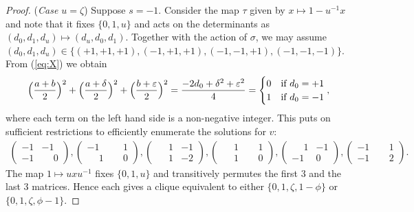 \documentclass{amsart}
\theoremstyle{plain}
\theoremstyle{definition}
\begin{document}
\begin{proof}
	(\emph{Case \(u=\zeta\)})
	Suppose \(s=-1\).
	Consider the map \(\tau\) given by \(x\mapsto1-u^{-1}x\) and note that it fixes \(\{0,1,u\}\) and acts on the determinants as \((d_0,d_1,d_u)\mapsto(d_u,d_0,d_1)\). Together with the action of \(\sigma\), we may assume \((d_0,d_1,d_u)\in\{(+1,+1,+1),(-1,+1,+1),(-1,-1,+1),(-1,-1,-1)\}\).
	From (\ref{eq:X}) we obtain
	\begin{align*}
		\Big(\frac{a+b}{2}\Big)^2 + \Big(\frac{a+\delta}{2}\Big)^2 + \Big(\frac{b+\varepsilon}{2}\Big)^2 = \frac{-2d_0+\delta^2+\varepsilon^2}{4} = 
		\begin{cases}
			0 & \textup{if } d_0=+1 \\
			1 & \textup{if } d_0=-1
		\end{cases},
	\end{align*}
	where each term on the left hand side is a non-negative integer. This puts on sufficient restrictions to efficiently enumerate the solutions for \(v\):
	\begin{align*}
		\begin{pmatrix}
			-1 & -1 \\
			-1 & \phantom{-}0
		\end{pmatrix},
		\begin{pmatrix}
			-1 & \phantom{-}1 \\
			\phantom{-}1 & \phantom{-}0
		\end{pmatrix},
		\begin{pmatrix}
			\phantom{-}1 & -1 \\
			\phantom{-}1 & -2
		\end{pmatrix},
		\begin{pmatrix}
			\phantom{-}1 & \phantom{-}1 \\
			\phantom{-}1 & \phantom{-}0
		\end{pmatrix},
		\begin{pmatrix}
			\phantom{-}1 & -1 \\
			-1 & 0
		\end{pmatrix},
		\begin{pmatrix}
			-1 & \phantom{-}1 \\
			-1 & \phantom{-}2
		\end{pmatrix}.
	\end{align*}
	The map \(1\mapsto u x u^{-1}\) fixes \(\{0,1,u\}\) and transitively permutes the first \(3\) and the last \(3\) matrices. Hence each gives a clique equivalent to either \(\{0,1,\zeta,1-\phi\}\) or \(\{0,1,\zeta,\phi-1\}\).
	

\end{proof}
\end{document}
